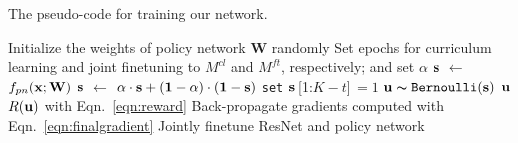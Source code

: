 \documentclass[10pt,twocolumn,letterpaper]{article}
\newcommand*\Let[2]{\State #1 $\gets$ #2}
\begin{document}
\begin{algorithm}[t]
\small
  \begin{algorithmic}[1]
      \caption{The pseudo-code for training our network.}
        \label{alg:training}
    \State Initialize the weights of policy network {\bf W} randomly
    \State Set epochs for curriculum learning and joint finetuning to $M^{cl}$ and $M^{ft}$, respectively; and set $\alpha$ 
        \Let{${\bf s}$}{$f_{pn}({\bf x}; {\bf W})$}
        \Let{${\bf s}$}{${\alpha \cdot \bf s + (1-\alpha) \cdot (1-\bf s)}$}
          \State \texttt{set} ${\bf s}$\,{\scriptsize[1:$K-t$]}$\,=1$ 
        \EndIf
        \State ${\bf u} \thicksim \texttt{Bernoulli}({\bf s})$
         ${\bf u}$
         $R({\bf u})$ {with Eqn.}~\ref{eqn:reward}
        \State Back-propagate gradients computed with Eqn.~\ref{eqn:finalgradient}
      \EndFor 
        \State Jointly finetune ResNet and policy network
      \EndFor 
  \end{algorithmic}
\end{algorithm}
\end{document}
